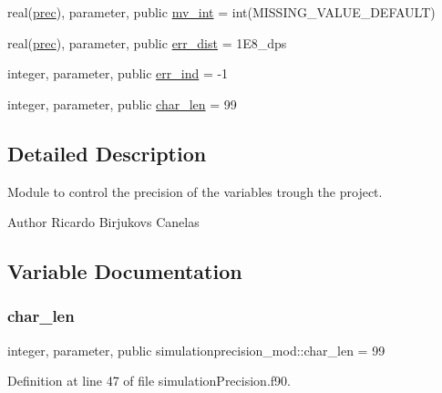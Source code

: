 \begin{DoxyCompactItemize}
\item 
real(\mbox{\hyperlink{namespacesimulationprecision__mod_a361ca48174e0dc2228c07f25fa5396ec}{prec}}), parameter, public \mbox{\hyperlink{namespacesimulationprecision__mod_a8d1d7d124b73efb89060c2d696b87bea}{mv\+\_\+int}} = int(M\+I\+S\+S\+I\+N\+G\+\_\+\+V\+A\+L\+U\+E\+\_\+\+D\+E\+F\+A\+U\+LT)
\item 
real(\mbox{\hyperlink{namespacesimulationprecision__mod_a361ca48174e0dc2228c07f25fa5396ec}{prec}}), parameter, public \mbox{\hyperlink{namespacesimulationprecision__mod_adb76b934d7acaf56b275c5cc1ecccc4c}{err\+\_\+dist}} = 1\+E8\+\_\+dps
\item 
integer, parameter, public \mbox{\hyperlink{namespacesimulationprecision__mod_a7931657e14fb825c4e20dc77ee8f7278}{err\+\_\+ind}} = -\/1
\item 
integer, parameter, public \mbox{\hyperlink{namespacesimulationprecision__mod_aba0af56595baca30b62618cc8c05883c}{char\+\_\+len}} = 99
\end{DoxyCompactItemize}


\subsection{Detailed Description}
Module to control the precision of the variables trough the project. 

\begin{DoxyAuthor}{Author}
Ricardo Birjukovs Canelas 
\end{DoxyAuthor}


\subsection{Variable Documentation}
\mbox{\label{namespacesimulationprecision__mod_aba0af56595baca30b62618cc8c05883c}} 
\subsubsection{\texorpdfstring{char\+\_\+len}{char\_len}}
{\footnotesize\ttfamily integer, parameter, public simulationprecision\+\_\+mod\+::char\+\_\+len = 99}



Definition at line 47 of file simulation\+Precision.\+f90.


